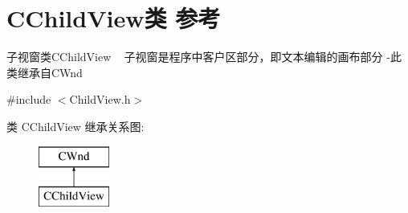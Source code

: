 \hypertarget{class_c_child_view}{}\section{C\+Child\+View类 参考}
\label{class_c_child_view}


子视窗类\+C\+Child\+View ~\newline
子视窗是程序中客户区部分，即文本编辑的画布部分 -\/此类继承自\+C\+Wnd  




{\ttfamily \#include $<$Child\+View.\+h$>$}

类 C\+Child\+View 继承关系图\+:\begin{figure}[H]
\begin{center}
\leavevmode
\includegraphics[height=2.000000cm]{class_c_child_view}
\end{center}
\end{figure}
